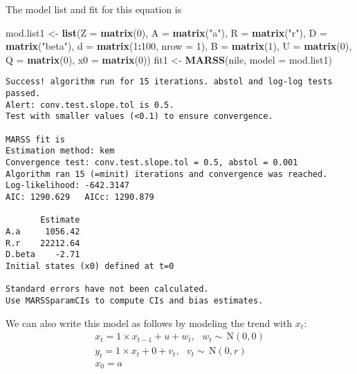 \documentclass[12pt,]{book}
\newenvironment{Shaded}{\begin{snugshade}}{\end{snugshade}}
\newcommand{\DataTypeTok}[1]{\textcolor[rgb]{0.13,0.29,0.53}{#1}}
\newcommand{\DecValTok}[1]{\textcolor[rgb]{0.00,0.00,0.81}{#1}}
\newcommand{\KeywordTok}[1]{\textcolor[rgb]{0.13,0.29,0.53}{\textbf{#1}}}
\newcommand{\NormalTok}[1]{#1}
\newcommand{\OperatorTok}[1]{\textcolor[rgb]{0.81,0.36,0.00}{\textbf{#1}}}
\newcommand{\StringTok}[1]{\textcolor[rgb]{0.31,0.60,0.02}{#1}}
\begin{document}
The model list and fit for this equation is

\begin{Shaded}
\begin{Highlighting}[]
\NormalTok{mod.list1 <-}\StringTok{ }\KeywordTok{list}\NormalTok{(}\DataTypeTok{Z =} \KeywordTok{matrix}\NormalTok{(}\DecValTok{0}\NormalTok{), }\DataTypeTok{A =} \KeywordTok{matrix}\NormalTok{(}\StringTok{"a"}\NormalTok{), }\DataTypeTok{R =} \KeywordTok{matrix}\NormalTok{(}\StringTok{"r"}\NormalTok{), }
    \DataTypeTok{D =} \KeywordTok{matrix}\NormalTok{(}\StringTok{"beta"}\NormalTok{), }\DataTypeTok{d =} \KeywordTok{matrix}\NormalTok{(}\DecValTok{1}\OperatorTok{:}\DecValTok{100}\NormalTok{, }\DataTypeTok{nrow =} \DecValTok{1}\NormalTok{), }\DataTypeTok{B =} \KeywordTok{matrix}\NormalTok{(}\DecValTok{1}\NormalTok{), }
    \DataTypeTok{U =} \KeywordTok{matrix}\NormalTok{(}\DecValTok{0}\NormalTok{), }\DataTypeTok{Q =} \KeywordTok{matrix}\NormalTok{(}\DecValTok{0}\NormalTok{), }\DataTypeTok{x0 =} \KeywordTok{matrix}\NormalTok{(}\DecValTok{0}\NormalTok{))}
\NormalTok{fit1 <-}\StringTok{ }\KeywordTok{MARSS}\NormalTok{(nile, }\DataTypeTok{model =}\NormalTok{ mod.list1)}
\end{Highlighting}
\end{Shaded}

\begin{verbatim}
Success! algorithm run for 15 iterations. abstol and log-log tests passed.
Alert: conv.test.slope.tol is 0.5.
Test with smaller values (<0.1) to ensure convergence.

MARSS fit is
Estimation method: kem 
Convergence test: conv.test.slope.tol = 0.5, abstol = 0.001
Algorithm ran 15 (=minit) iterations and convergence was reached. 
Log-likelihood: -642.3147 
AIC: 1290.629   AICc: 1290.879   
 
       Estimate
A.a     1056.42
R.r    22212.64
D.beta    -2.71
Initial states (x0) defined at t=0

Standard errors have not been calculated. 
Use MARSSparamCIs to compute CIs and bias estimates.
\end{verbatim}

We can also write this model as follows by modeling the trend with \(x_t\):
\begin{equation}
\begin{gathered}
x_t = 1 \times x_{t-1} + u + w_t, \text{ } w_t \sim \,\text{N}(0,0) \\
y_t = 1 \times x_t + 0 + v_t, \text{ } v_t \sim \,\text{N}(0,r)  \\
x_0 = a 
\end{gathered}   
\label{eq:short-linear-level-model2}
\end{equation}
\end{document}
